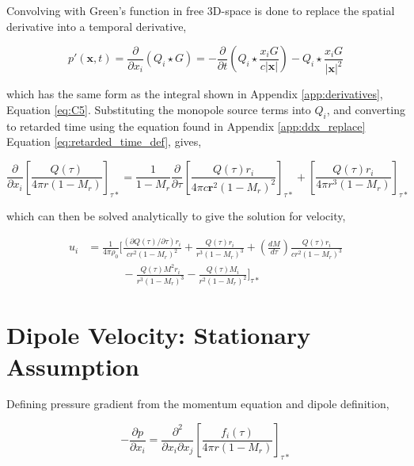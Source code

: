 Convolving with Green's function in free 3D-space is done to replace the spatial derivative into a temporal derivative,

\begin{equation*}
    p'(\bm{x}, t) = \frac{\partial}{\partial x_i} (Q_i \star G) =
    - \frac{\partial}{\partial t} \left( 
    Q_i \star \frac{x_iG}{c|\bm{x}|}
    \right) -
    Q_i \star \frac{x_i G}{|\bm{x}|^2}
    \label{eq:convolve_monopole}
\end{equation*}

which has the same form as the integral shown in Appendix \ref{app:derivatives}, Equation \ref{eq:C5}. Substituting the monopole source terms into $Q_i$, and converting to retarded time using the equation found in Appendix \ref{app:ddx_replace} Equation \ref{eq:retarded_time_def}, gives,

\begin{equation*}
    \frac{\partial}{\partial x_i} \left[ 
    \frac{Q(\tau)}{4\pi r (1-M_r)}
    \right]_{\tau*}
    = \frac{1}{1-M_r} \frac{\partial}{\partial\tau} \left[ 
    \frac{Q(\tau)r_i}{4\pi c \bm{r}^2 (1-M_r)^2}
    \right]_{\tau *}
    + \left[ 
    \frac{Q(\tau)r_i}{4 \pi r^3 (1-M_r)}
    \right]_{\tau*}
    \label{eq:monopole_velocity_underived}
\end{equation*}

which can then be solved analytically to give the solution for velocity,

\begin{equation}
    \begin{split}
    u_i 
    &= \frac{1}{4\pi\rho_0} \Bigg[ \frac{(\partial Q(\tau)/\partial \tau)r_i}{c r^2(1 - M_r)^2} 
    + \frac{Q(\tau)r_i}{r^3(1-M_r)^3}
    + \left(\frac{dM}{d\tau} \right) \frac{Q(\tau)r_i}{cr^2(1-M_r)^3} \\
    &\phantom{= \frac{1}{4\pi\rho_0}
    \Bigg[} - \frac{Q(\tau)M^2r_i}{r^3(1-M_r)^3}
    - \frac{Q(\tau)M_i}{r^2(1-M_r)^2}
    \Bigg]_{\tau*}
    \end{split}
\end{equation}


\chapter{Dipole Velocity: Stationary Assumption} \label{app:zeroMach}
Defining pressure gradient from the momentum equation and dipole definition,

\begin{equation*}
    -\frac{\partial p}{\partial x_i} = 
    \frac{\partial^2}{\partial x_i \partial x_j} \left[ 
    \frac{f_i(\tau)}{4\pi r (1-M_r)}
    \right]_{\tau*}
\end{equation*}

